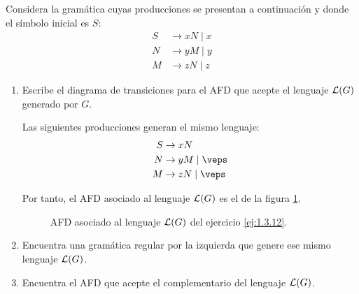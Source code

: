 \begin{ejercicio}\label{ej:1.3.12}
    Considera la gramática cuyas producciones se presentan a continuación y donde el símbolo inicial es $S$:
    \begin{align*}
        S &\rightarrow xN\mid  x \\
        N &\rightarrow yM\mid  y \\
        M &\rightarrow zN\mid  z
    \end{align*}
    \begin{enumerate}
        \item Escribe el diagrama de transiciones para el AFD que acepte el lenguaje $\mathcal{L}(G)$ generado por $G$.
        
        Las siguientes producciones generan el mismo lenguaje:
        \begin{align*}
            S &\rightarrow xN\\
            N &\rightarrow yM\mid \veps \\
            M &\rightarrow zN\mid \veps
        \end{align*}

        Por tanto, el AFD asociado al lenguaje $\mathcal{L}(G)$ es el de la figura \ref{fig:1.3.12-AFD}.
        \begin{figure}[H]
            \centering
            \caption{AFD asociado al lenguaje $\mathcal{L}(G)$ del ejercicio \ref{ej:1.3.12}.}
            \label{fig:1.3.12-AFD}
        \end{figure}
        \item Encuentra una gramática regular por la izquierda que genere ese mismo lenguaje $\mathcal{L}(G)$.
        
        \item Encuentra el AFD que acepte el complementario del lenguaje $\mathcal{L}(G)$.
    \end{enumerate}
\end{ejercicio}

